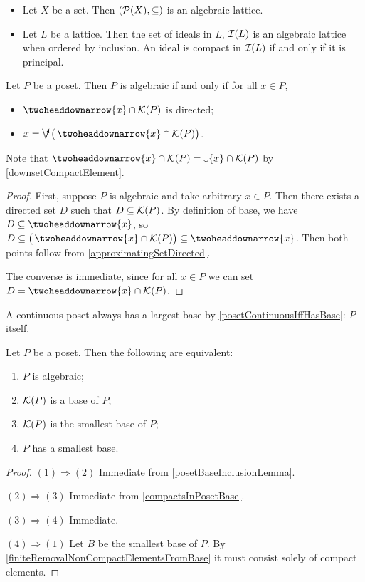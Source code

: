\begin{example}
\begin{itemize}
\item Let $X$ be a set. Then $\sSet{\powerset(X), \subseteq}$ is an algebraic lattice.
\item Let $L$ be a lattice. Then the set of ideals in $L$, $\operatorname{\mathcal{I}}(L)$ is an algebraic lattice when ordered by inclusion. An ideal is compact in $\operatorname{\mathcal{I}}(L)$ if and only if it is principal.
\end{itemize}
\end{example}

\begin{lemma} \label{algebraicPosetLemma}
Let $P$ be a poset. Then $P$ is algebraic \textup{if and only if} for all $x\in P$,
\begin{itemize}
\item $\ddownset \{x\}\cap \compacts(P)$ is directed;
\item $x = \dirvee\big(\ddownset \{x\}\cap \compacts(P)\big)$.
\end{itemize}
\end{lemma}
Note that $\ddownset \{x\}\cap \compacts(P) = \downset \{x\}\cap \compacts(P)$ by \ref{downsetCompactElement}.
\begin{proof}
First, suppose $P$ is algebraic and take arbitrary $x\in P$. Then there exists a directed set $D$ such that $D\subseteq \operatorname{\mathcal{K}}(P)$. By definition of base, we have $D\subseteq \ddownset\{x\}$, so $D\subseteq \big(\ddownset \{x\}\cap \compacts(P)\big)\subseteq \ddownset\{x\}$. Then both points follow from \ref{approximatingSetDirected}.

The converse is immediate, since for all $x\in P$ we can set $D = \ddownset \{x\}\cap \compacts(P)$.
\end{proof}

A continuous poset always has a largest base by \ref{posetContinuousIffHasBase}: $P$ itself.
\begin{proposition}
Let $P$ be a poset. Then the following are equivalent:
\begin{enumerate}
\item $P$ is algebraic;
\item $\operatorname{\mathcal{K}}(P)$ is a base of $P$;
\item $\operatorname{\mathcal{K}}(P)$ is the smallest base of $P$;
\item $P$ has a smallest base.
\end{enumerate}
\end{proposition}
\begin{proof}
$(1) \Rightarrow (2)$ Immediate from \ref{posetBaseInclusionLemma}.

$(2) \Rightarrow (3)$ Immediate from \ref{compactsInPosetBase}.

$(3) \Rightarrow (4)$ Immediate.

$(4) \Rightarrow (1)$ Let $B$ be the smallest base of $P$. By \ref{finiteRemovalNonCompactElementsFromBase} it must consist solely of compact elements.
\end{proof}

